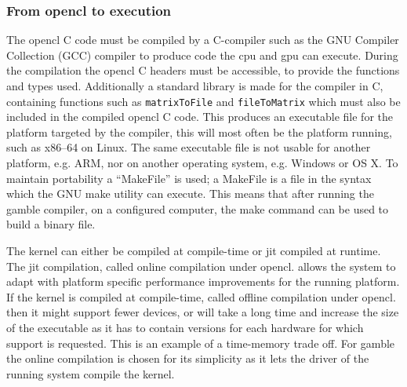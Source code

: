 \subsubsection*{From \gls{opencl} to execution}\label{ssub:makefile}
The \gls{opencl} C code must be compiled by a C-compiler such as the GNU Compiler Collection (GCC) compiler to produce code the \acrshort{cpu} and \acrshort{gpu} can execute.
During the compilation the \gls{opencl} C headers must be accessible, to provide the functions and types used. 
Additionally a standard library is made for the compiler in C, containing functions such as \texttt{matrixToFile} and \texttt{fileToMatrix} which must also be included in the compiled \gls{opencl} C code.
This produces an executable file for the platform targeted by the compiler, this will most often be the platform running, such as x86--64 on Linux.
The same executable file is not usable for another platform, e.g. ARM, nor on another operating system, e.g. Windows or OS X.
To maintain portability a ``MakeFile'' is used; a MakeFile is a file in the syntax which the GNU make utility can execute. 
This means that after running the \gls{gamble} compiler, on a configured computer, the make command can be used to build a binary file.

The kernel can either be compiled at compile-time or \acrshort{jit} compiled at runtime.
The \acrshort{jit} compilation, called online compilation under \gls{opencl}. allows the system to adapt with platform specific performance improvements for the running platform.
If the kernel is compiled at compile-time, called offline compilation under \gls{opencl}. then it might support fewer devices, or will take a long time and increase the size of the executable as it has to contain versions for each hardware for which support is requested. \citep{openclbookjit}
This is an example of a time-memory trade off. 
For \gls{gamble} the online compilation is chosen for its simplicity as it lets the driver of the running system compile the kernel. 